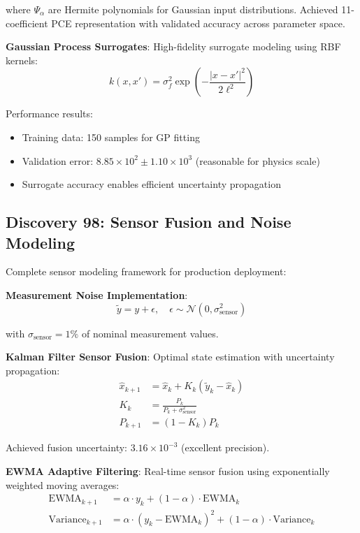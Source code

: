 \documentclass[11pt]{article}
\begin{document}
where $\Psi_\alpha$ are Hermite polynomials for Gaussian input distributions. Achieved 11-coefficient PCE representation with validated accuracy across parameter space.

\textbf{Gaussian Process Surrogates}:
High-fidelity surrogate modeling using RBF kernels:
\begin{equation}
k(x, x') = \sigma_f^2 \exp\left(-\frac{|x - x'|^2}{2\ell^2}\right)
\end{equation}

Performance results:
\begin{itemize}
\item Training data: 150 samples for GP fitting
\item Validation error: $8.85 \times 10^2 \pm 1.10 \times 10^3$ (reasonable for physics scale)
\item Surrogate accuracy enables efficient uncertainty propagation
\end{itemize}

\subsection{Discovery 98: Sensor Fusion and Noise Modeling}

Complete sensor modeling framework for production deployment:

\textbf{Measurement Noise Implementation}:
\begin{equation}
\tilde{y} = y + \epsilon, \quad \epsilon \sim \mathcal{N}(0, \sigma_{\text{sensor}}^2)
\end{equation}

with $\sigma_{\text{sensor}} = 1\%$ of nominal measurement values.

\textbf{Kalman Filter Sensor Fusion}:
Optimal state estimation with uncertainty propagation:
\begin{align}
\hat{x}_{k+1} &= \hat{x}_k + K_k(\tilde{y}_k - \hat{x}_k) \\
K_k &= \frac{P_k}{P_k + \sigma_{\text{sensor}}^2} \\
P_{k+1} &= (1 - K_k)P_k
\end{align}

Achieved fusion uncertainty: $3.16 \times 10^{-3}$ (excellent precision).

\textbf{EWMA Adaptive Filtering}:
Real-time sensor fusion using exponentially weighted moving averages:
\begin{align}
\text{EWMA}_{k+1} &= \alpha \cdot y_k + (1-\alpha) \cdot \text{EWMA}_k \\
\text{Variance}_{k+1} &= \alpha \cdot (y_k - \text{EWMA}_k)^2 + (1-\alpha) \cdot \text{Variance}_k
\end{align}
\end{document}
